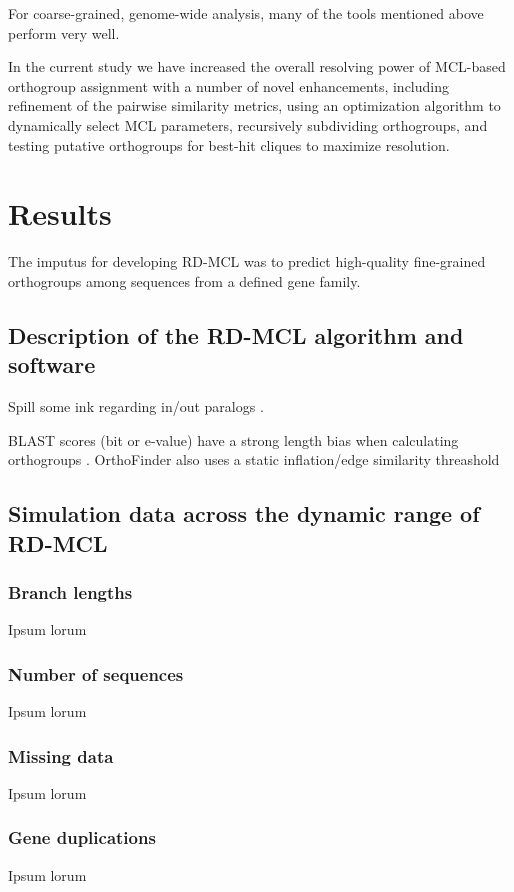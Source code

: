 \documentclass[twocolumn]{bmcart}%
\begin{document}
For coarse-grained, genome-wide analysis, many of the tools mentioned above perform very well.

In the current study we have increased the overall resolving power of MCL-based orthogroup assignment with a number of novel enhancements, including refinement of the pairwise similarity metrics, using an optimization algorithm to dynamically select MCL parameters, recursively subdividing orthogroups, and testing putative orthogroups for best-hit cliques to maximize resolution.


\section*{Results}
The imputus for developing RD-MCL was to predict high-quality fine-grained orthogroups among sequences from a defined gene family.

\subsection*{Description of the RD-MCL algorithm and software}
Spill some ink regarding in/out paralogs \cite{Sonnhammer:2002vm,Tekaia:2016ga}.

BLAST scores (bit or e-value) have a strong length bias when calculating orthogroups \cite{Emms:2015ig}. OrthoFinder also uses a static inflation/edge similarity threashold \cite{Emms:2015ig}

\subsection*{Simulation data across the dynamic range of RD-MCL}
\subsubsection*{Branch lengths}
Ipsum lorum

\subsubsection*{Number of sequences}
Ipsum lorum

\subsubsection*{Missing data}
Ipsum lorum

\subsubsection*{Gene duplications}
Ipsum lorum
\end{document}
